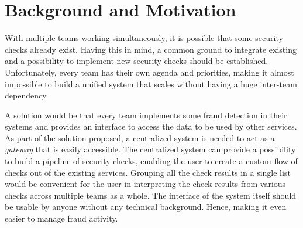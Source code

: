 \section{Background and Motivation}

  With multiple teams working simultaneously, it is possible that some security checks already exist. Having this in mind, a common ground to integrate existing and a possibility to implement new security checks should be established. Unfortunately, every team has their own agenda and priorities, making it almost impossible to build a unified system that scales without having a huge inter-team dependency. 

  A solution would be that every team implements some fraud detection in their systems and provides an interface to access the data to be used by other services. As part of the solution proposed, a centralized system is needed to act as a \emph{gateway} that is easily accessible. The centralized system can provide a possibility to build a pipeline of security checks, enabling the user to create a custom flow of checks out of the existing services. Grouping all the check results in a single list would be convenient for the user in interpreting the check results from various checks across multiple teams as a whole. The interface of the system itself should be usable by anyone without any technical background. Hence, making it even easier to manage fraud activity.